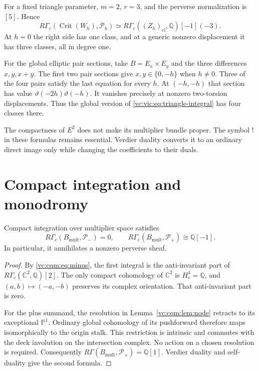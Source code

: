 For a fixed triangle parameter, $m=2$, $r=3$, and the
perverse normalization is $[5]$. Hence
\begin{equation}\label{vc:vic:eq:triangle-integral}
 R\Gamma_c(\operatorname{Crit}(W_h),\mathcal P_h)
       \simeq R\Gamma_c((Z_h)_{\mathrm{cl}},\mathbb Q)[-1](-3).
\end{equation}
At $h=0$ the right side has one class, and at a generic
nonzero displacement it has three classes, all in degree one.

For the global elliptic pair sections, take
$B=E_x\times E_y$ and the three differences $x,y,x+y$.
The first two pair sections give $x,y\in\{0,-h\}$ when
$h\ne0$. Three of the four pairs satisfy the last equation
for every $h$. At $(-h,-h)$ that section has value
$\vartheta(-2h)\vartheta(-h)$. It vanishes precisely at
nonzero two-torsion displacements. Thus the global version
of \eqref{vc:vic:eq:triangle-integral} has four classes there.

The compactness of $E^2$ does not make its multiplier
bundle proper. The symbol $!$ in these formulas remains
essential. Verdier duality converts it to an ordinary direct
image only while changing the coefficients to their duals.

\section{Compact integration and monodromy}

\begin{proposition}\label{vc:cqm:prop:integral}
Compact integration over multiplier space satisfies
\begin{equation}\label{vc:cqm:eq:integrals}
 R\Gamma_c(B_{\mathrm{mult}},\mathcal P_-)=0,\qquad
 R\Gamma_c(B_{\mathrm{mult}},\mathcal P_+)\cong\mathbb Q[-1].
\end{equation}
In particular, it annihilates a nonzero perverse sheaf.
\end{proposition}

\begin{proof}
By \eqref{vc:cqm:eq:minus}, the first integral is the
anti-invariant part of
$R\Gamma_c(\mathbb C^2,\mathbb Q)[2]$.
The only compact cohomology of $\mathbb C^2$ is
$H_c^4=\mathbb Q$, and $(a,b)\mapsto(-a,-b)$ preserves
its complex orientation. That anti-invariant part is zero.

For the plus summand, the resolution in
Lemma~\ref{vc:cqm:lem:node} retracts to its exceptional
$\mathbb P^1$. Ordinary global cohomology of its
pushforward therefore maps isomorphically to the
origin stalk. This restriction is intrinsic and
commutes with the deck involution on the intersection
complex. No action on a chosen resolution is required.
Consequently
$R\Gamma(B_{\mathrm{mult}},\mathcal P_+)=\mathbb Q[1]$.
Verdier duality and self-duality give the second formula.
\end{proof}

